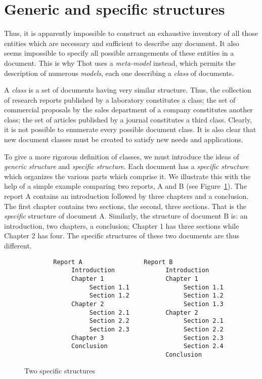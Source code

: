 \section{Generic and specific structures}

Thus, it is apparently impossible to construct an exhaustive inventory of
all those entities which are necessary and sufficient to describe any
document. It also seems impossible to specify all possible
arrangements of these entities in a document.  This is why Thot uses a
{\em meta-model} instead, which permits the description of numerous
{\em models}, each one describing a {\em class} of documents.

A {\em class} is a set of documents having very similar structure.
Thus, the collection of research reports published by a laboratory
constitutes a class; the set of commercial proposals by the sales
department of a company constitutes another class; the set of articles
published by a journal constitutes a third class.  Clearly, it is not
possible to enumerate every possible document class.  It is also clear
that new document classes must be created to satisfy new needs and
applications.

To give a more rigorous definition of classes, we must introduce the
ideas of {\em generic structure} and {\em specific structure}.  Each
document has a {\em specific structure} which organizes the various
parts which comprise it.  We illustrate this with the help of a simple
example comparing two reports, A and B (see Figure~\ref{structspec}).
The report A contains an introduction followed by three chapters and a
conclusion.  The first chapter contains two sections, the second, three
sections.  That is the {\em specific} structure of document A.
Similarly, the structure of document B is: an introduction, two
chapters, a conclusion; Chapter 1 has three sections while Chapter 2
has four.  The specific structures of these two documents are thus
different. 

\begin{figure}
\begin{verbatim}
        Report A                 Report B
             Introduction              Introduction
             Chapter 1                 Chapter 1
                  Section 1.1               Section 1.1
                  Section 1.2               Section 1.2
             Chapter 2                      Section 1.3
                  Section 2.1          Chapter 2
                  Section 2.2               Section 2.1
                  Section 2.3               Section 2.2
             Chapter 3                      Section 2.3
             Conclusion                     Section 2.4
                                       Conclusion
\end{verbatim}
\caption{Two specific structures}
\label{structspec}
\end{figure}

